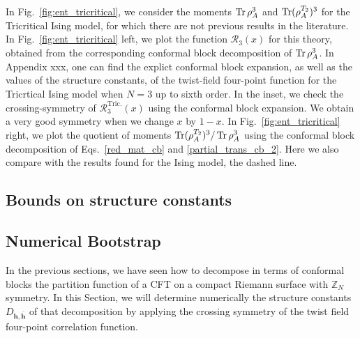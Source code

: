 \documentclass[a4paper,11pt]{article}
\def\Tr{\mathop{\mbox{\normalfont Tr}}\nolimits}
\begin{document}
In Fig.~\ref{fig:ent_tricritical}, we consider the moments $\Tr\rho_A^3$ and 
$\Tr(\rho_A^{T_2})^3$ for the Tricritical Ising model, for which there are not 
previous results in the literature. In Fig.~\ref{fig:ent_tricritical} left, we plot 
the function $\mathcal{R}_3(x)$ for this theory, obtained from the corresponding conformal block 
decomposition of $\Tr\rho_A^3$. In Appendix xxx, one can find the explict conformal block expansion, 
as well as the values of the structure constants, of the twist-field four-point function for the 
Tricrtical Ising model when $N=3$ up to sixth order. In the inset, we check the crossing-symmetry 
of $\mathcal{R}_3^{\text{Tric.}}(x)$ using the conformal block expansion. We obtain a very good 
symmetry when we change $x$ by $1-x$. In Fig.~\ref{fig:ent_tricritical} right, we plot the quotient 
of moments $\Tr(\rho_A^{T_2})^3/\Tr\rho_A^3$ using the conformal block decomposition of Eqs.~\eqref{red_mat_cb} and \eqref{partial_trans_cb_2}.  Here we also compare with the results found for the Ising model, the dashed line. 



\subsection{Bounds on structure constants}

\subsection{Numerical Bootstrap}
In the previous sections, we have seen how to decompose in terms of conformal blocks 
the partition function of a CFT on a compact Riemann surface with $\mathbb{Z}_N$ symmetry. 
In this Section, we will determine numerically the structure constants $D_{\boldsymbol{h}, \boldsymbol{\bar{h}}}$
of that decomposition by applying the crossing symmetry of the twist field four-point 
correlation function.
\end{document}
